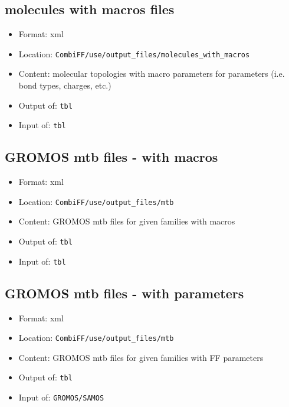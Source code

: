 \documentclass[a4paper,11pt]{article}
\begin{document}
\subsection{molecules with macros files}
\label{filetype_fis}
\begin{itemize}
\item Format: xml
\item Location: \texttt{CombiFF/use/output\_files/molecules\_with\_macros}
\item Content: molecular topologies with macro parameters for parameters (i.e. bond types, charges, etc.)
\item Output of: \texttt{tbl}
\item Input of: \texttt{tbl}
\end{itemize}

\subsection{GROMOS mtb files - with macros}
\label{filetype_mtb}

\begin{itemize}
\item Format: xml
\item Location: \texttt{CombiFF/use/output\_files/mtb}
\item Content: GROMOS mtb files for given families with macros
\item Output of: \texttt{tbl}
\item Input of: \texttt{tbl}
\end{itemize}

\subsection{GROMOS mtb files - with parameters}
\label{filetype_mtb}

\begin{itemize}
\item Format: xml
\item Location: \texttt{CombiFF/use/output\_files/mtb}
\item Content: GROMOS mtb files for given families with FF parameters
\item Output of: \texttt{tbl}
\item Input of: \texttt{GROMOS/SAMOS}
\end{itemize}
\end{document}
